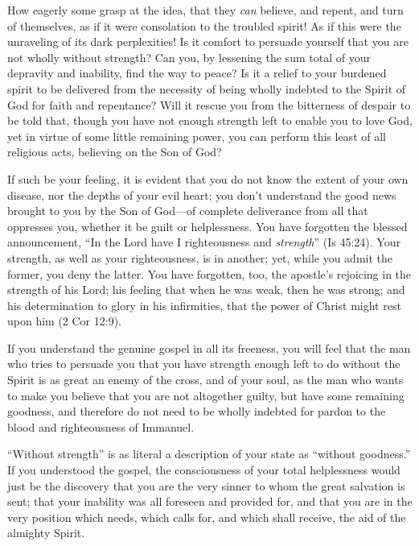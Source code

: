 \documentclass[
]{book}
\begin{document}
How eagerly some grasp at the idea, that they \emph{can} believe, and repent, and turn of themselves, as if it were consolation to the troubled spirit! As if this were the unraveling of its dark perplexities! Is it comfort to persuade yourself that you are not wholly without strength? Can you, by lessening the sum total of your depravity and inability, find the way to peace? Is it a relief to your burdened spirit to be delivered from the necessity of being wholly indebted to the Spirit of God for faith and repentance? Will it rescue you from the bitterness of despair to be told that, though you have not enough strength left to enable you to love God, yet in virtue of some little remaining power, you can perform this least of all religious acts, believing on the Son of God?

If such be your feeling, it is evident that you do not know the extent of your own disease, nor the depths of your evil heart; you don't understand the good news brought to you by the Son of God---of complete deliverance from all that oppresses you, whether it be guilt or helplessness. You have forgotten the blessed announcement, ``In the Lord have I righteousness and \emph{strength}'' (Is 45:24). Your strength, as well as your righteousness, is in another; yet, while you admit the former, you deny the latter. You have forgotten, too, the apostle's rejoicing in the strength of his Lord; his feeling that when he was weak, then he was strong; and his determination to glory in his infirmities, that the power of Christ might rest upon him (2 Cor 12:9).

If you understand the genuine gospel in all its freeness, you will feel that the man who tries to persuade you that you have strength enough left to do without the Spirit is as great an enemy of the cross, and of your soul, as the man who wants to make you believe that you are not altogether guilty, but have some remaining goodness, and therefore do not need to be wholly indebted for pardon to the blood and righteousness of Immanuel.

``Without strength'' is as literal a description of your state as ``without goodness.'' If you understood the gospel, the consciousness of your total helplessness would just be the discovery that you are the very sinner to whom the great salvation is sent; that your inability was all foreseen and provided for, and that you are in the very position which needs, which calls for, and which shall receive, the aid of the almighty Spirit.
\end{document}
